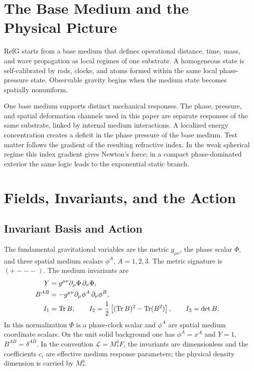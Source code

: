 \documentclass[12pt,a4paper]{article}
\begin{document}
\section{The Base Medium and the Physical Picture}

RefG starts from a base medium that defines operational distance, time, mass, and wave propagation as local regimes of one substrate. A homogeneous state is self-calibrated by rods, clocks, and atoms formed within the same local phase-pressure state. Observable gravity begins when the medium state becomes spatially nonuniform.

One base medium supports distinct mechanical responses. The phase, pressure, and spatial deformation channels used in this paper are separate responses of the same substrate, linked by internal medium interactions. A localized energy concentration creates a deficit in the phase pressure of the base medium. Test matter follows the gradient of the resulting refractive index. In the weak spherical regime this index gradient gives Newton's force; in a compact phase-dominated exterior the same logic leads to the exponential static branch.

\section{Fields, Invariants, and the Action}

\subsection{Invariant Basis and Action}

The fundamental gravitational variables are the metric $g_{\mu\nu}$, the phase scalar $\Phi$, and three spatial medium scalars $\phi^A$, $A=1,2,3$. The metric signature is $(+---)$. The medium invariants are
\begin{align*}
Y &= g^{\mu\nu}\partial_\mu\Phi\,\partial_\nu\Phi,\\
B^{AB} &= -g^{\mu\nu}\partial_\mu\phi^A\,\partial_\nu\phi^B,\\
I_1 &= {\rm Tr}\,B,\qquad
I_2=\frac{1}{2}\left[({\rm Tr}\,B)^2-{\rm Tr}(B^2)\right],\qquad
I_3=\det B.
\end{align*}
In this normalization $\Phi$ is a phase-clock scalar and $\phi^A$ are spatial medium coordinate scalars. On the unit solid background one has $\phi^A=x^A$ and $Y=1$, $B^{AB}=\delta^{AB}$. In the convention $\mathcal L=M_*^4F$, the invariants are dimensionless and the coefficients $c_i$ are effective medium response parameters; the physical density dimension is carried by $M_*^4$.
\end{document}
